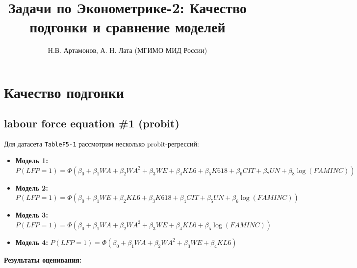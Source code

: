 \documentclass[
  russian,
]{article}
\title{Задачи по Эконометрике-2: Качество подгонки и сравнение моделей}
\author{Н.В. Артамонов, А. Н. Лата (МГИМО МИД России)}
\date{}
\providecommand{\tightlist}{%
  \setlength{\itemsep}{0pt}\setlength{\parskip}{0pt}}
\renewcommand*\contentsname{Содержание}
\newcommand\contentsname{Содержание}
\begin{document}
\maketitle

\renewcommand*\contentsname{Содержание}
{
\setcounter{tocdepth}{3}
\tableofcontents
}

\section{Качество
подгонки}\label{ux43aux430ux447ux435ux441ux442ux432ux43e-ux43fux43eux434ux433ux43eux43dux43aux438}

\subsection{labour force equation \#1
(probit)}\label{labour-force-equation-1-probit}

Для датасета \texttt{TableF5-1} рассмотрим несколько probit-регрессий:

\begin{itemize}
\tightlist
\item
  \textbf{Модель 1:}
  \(P(LFP=1) = \Phi(\beta_0 + \beta_1 WA + \beta_2 WA^2 + \beta_3 WE + \beta_4 KL6 + \beta_5 K618 + \beta_6 CIT + \beta_7 UN + \beta_8 \log(FAMINC))\)
\item
  \textbf{Модель 2:}
  \(P(LFP=1) = \Phi(\beta_0 + \beta_1 WE + \beta_2 KL6 + \beta_3 K618 + \beta_4 CIT + \beta_5 UN + \beta_6 \log(FAMINC))\)
\item
  \textbf{Модель 3:}
  \(P(LFP=1) = \Phi(\beta_0 + \beta_1 WA + \beta_2 WA^2 + \beta_3 WE + \beta_4 KL6 + \beta_5 \log(FAMINC))\)
\item
  \textbf{Модель 4:}
  \(P(LFP=1) = \Phi(\beta_0 + \beta_1 WA + \beta_2 WA^2 + \beta_3 WE + \beta_4 KL6)\)
\end{itemize}

\textbf{Результаты оценивания:}
\end{document}
